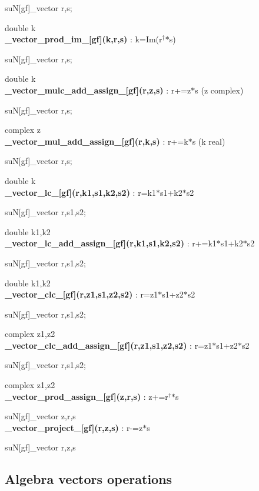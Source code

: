 \documentclass[10pt]{article}
\begin{document}
suN[gf]\_vector r,s;

double k\\


\noindent\textbf{\_vector\_prod\_im\_[gf](k,r,s) } : k=Im(r$^\dagger$$*$s)

suN[gf]\_vector r,s;

double k\\


\noindent\textbf{\_vector\_mulc\_add\_assign\_[gf](r,z,s) } : r+=z$*$s (z complex)

suN[gf]\_vector r,s;

complex z\\


\noindent\textbf{\_vector\_mul\_add\_assign\_[gf](r,k,s) } :  r+=k$*$s (k real)

suN[gf]\_vector r,s;

double k\\


\noindent\textbf{\_vector\_lc\_[gf](r,k1,s1,k2,s2) } : r=k1$*$s1+k2$*$s2

suN[gf]\_vector r,s1,s2;

double k1,k2\\


\noindent\textbf{\_vector\_lc\_add\_assign\_[gf](r,k1,s1,k2,s2) } : r+=k1$*$s1+k2$*$s2

suN[gf]\_vector r,s1,s2;

double k1,k2\\


\noindent\textbf{\_vector\_clc\_[gf](r,z1,s1,z2,s2) } : r=z1$*$s1+z2$*$s2

suN[gf]\_vector r,s1,s2;

complex z1,z2\\


\noindent\textbf{\_vector\_clc\_add\_assign\_[gf](r,z1,s1,z2,s2) } : r=z1$*$s1+z2$*$s2

suN[gf]\_vector r,s1,s2;

complex z1,z2\\


\noindent\textbf{\_vector\_prod\_assign\_[gf](z,r,s) } : z+=r$^\dagger$$*$s

suN[gf]\_vector z,r,s\\


\noindent\textbf{\_vector\_project\_[gf](r,z,s) } : r-=z$*$s

suN[gf]\_vector r,z,s


\subsection{Algebra vectors operations}
\end{document}

